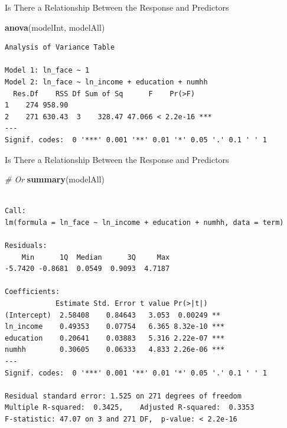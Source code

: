 \documentclass[
  ignorenonframetext,
]{beamer}
\newenvironment{Shaded}{\begin{snugshade}}{\end{snugshade}}
\newcommand{\CommentTok}[1]{\textcolor[rgb]{0.56,0.35,0.01}{\textit{#1}}}
\newcommand{\FunctionTok}[1]{\textcolor[rgb]{0.13,0.29,0.53}{\textbf{#1}}}
\newcommand{\NormalTok}[1]{#1}
\begin{document}
\begin{frame}[fragile]{Is There a Relationship Between the Response and
Predictors}
\label{is-there-a-relationship-between-the-response-and-predictors-2}
\normalsize

\begin{Shaded}
\begin{Highlighting}[]
\FunctionTok{anova}\NormalTok{(modelInt, modelAll)}
\end{Highlighting}
\end{Shaded}

\begin{verbatim}
Analysis of Variance Table

Model 1: ln_face ~ 1
Model 2: ln_face ~ ln_income + education + numhh
  Res.Df    RSS Df Sum of Sq      F    Pr(>F)    
1    274 958.90                                  
2    271 630.43  3    328.47 47.066 < 2.2e-16 ***
---
Signif. codes:  0 '***' 0.001 '**' 0.01 '*' 0.05 '.' 0.1 ' ' 1
\end{verbatim}

\normalsize
\end{frame}

\begin{frame}[fragile]{Is There a Relationship Between the Response and
Predictors}
\label{is-there-a-relationship-between-the-response-and-predictors-3}
\scriptsize

\begin{Shaded}
\begin{Highlighting}[]
\CommentTok{\# Or}
\FunctionTok{summary}\NormalTok{(modelAll)}
\end{Highlighting}
\end{Shaded}

\begin{verbatim}

Call:
lm(formula = ln_face ~ ln_income + education + numhh, data = term)

Residuals:
    Min      1Q  Median      3Q     Max 
-5.7420 -0.8681  0.0549  0.9093  4.7187 

Coefficients:
            Estimate Std. Error t value Pr(>|t|)    
(Intercept)  2.58408    0.84643   3.053  0.00249 ** 
ln_income    0.49353    0.07754   6.365 8.32e-10 ***
education    0.20641    0.03883   5.316 2.22e-07 ***
numhh        0.30605    0.06333   4.833 2.26e-06 ***
---
Signif. codes:  0 '***' 0.001 '**' 0.01 '*' 0.05 '.' 0.1 ' ' 1

Residual standard error: 1.525 on 271 degrees of freedom
Multiple R-squared:  0.3425,    Adjusted R-squared:  0.3353 
F-statistic: 47.07 on 3 and 271 DF,  p-value: < 2.2e-16
\end{verbatim}

\normalsize
\end{frame}
\end{document}
